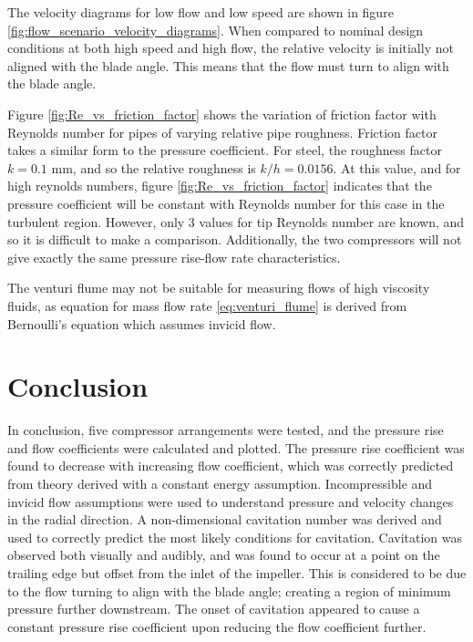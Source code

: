 \documentclass{article}
\begin{document}
The velocity diagrams for low flow and low speed are shown in figure \ref{fig:flow_scenario_velocity_diagrams}.
When compared to nominal design conditions at both high speed and high flow, the relative velocity is initially not aligned with the blade angle.
This means that the flow must turn to align with the blade angle.




Figure \ref{fig:Re_vs_friction_factor} shows the variation of friction factor with Reynolds number for pipes of varying relative pipe roughness.
Friction factor takes a similar form to the pressure coefficient.
For steel, the roughness factor $k = 0.1$ mm, and so the relative roughness is $k/h = 0.0156$.
At this value, and for high reynolds numbers, figure \ref{fig:Re_vs_friction_factor} indicates that the
pressure coefficient will be constant with Reynolds number for this case in the turbulent region.
However, only 3 values for tip Reynolds number are known, and so it is difficult to make a comparison.
Additionally, the two compressors will not give exactly the same pressure rise-flow rate characteristics.

The venturi flume may not be suitable for measuring flows of high viscosity fluids, as equation for mass flow rate \ref{eq:venturi_flume} 
is derived from Bernoulli's equation which assumes invicid flow.

\section{Conclusion}

In conclusion, five compressor arrangements were tested, and the pressure rise and flow coefficients were calculated and plotted.
The pressure rise coefficient was found to decrease with increasing flow coefficient, 
which was correctly predicted from theory derived with a constant energy assumption.
Incompressible and invicid flow assumptions were used to understand pressure and velocity changes in the radial direction.
A non-dimensional cavitation number was derived and used to correctly predict the most likely conditions for cavitation.
Cavitation was observed both visually and audibly, and was found to occur at a point on the trailing edge but offset from the inlet of the impeller.
This is considered to be due to the flow turning to align with the blade angle; creating a region of minimum pressure further downstream.
The onset of cavitation appeared to cause a constant pressure rise coefficient upon reducing the flow coefficient further.
\end{document}
